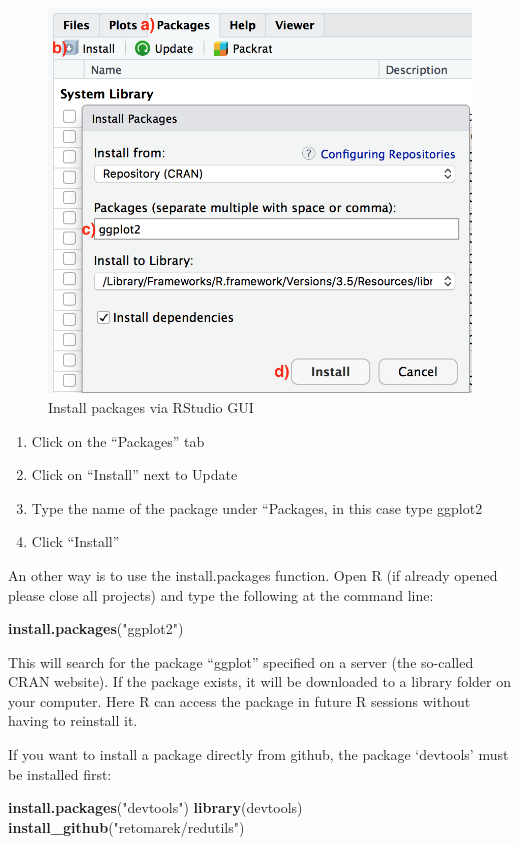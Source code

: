 \documentclass[
]{book}
\newenvironment{Shaded}{\begin{snugshade}}{\end{snugshade}}
\newcommand{\KeywordTok}[1]{\textcolor[rgb]{0.13,0.29,0.53}{\textbf{#1}}}
\newcommand{\NormalTok}[1]{#1}
\newcommand{\StringTok}[1]{\textcolor[rgb]{0.31,0.60,0.02}{#1}}
\begin{document}
\begin{figure}
\includegraphics[width=0.5\linewidth]{images/a2-installPackagesRStudio} \caption{Install packages via RStudio GUI}\label{fig:knitr-logo}
\end{figure}

\begin{enumerate}
\def\labelenumi{\alph{enumi})}
\item
  Click on the ``Packages'' tab
\item
  Click on ``Install'' next to Update
\item
  Type the name of the package under ``Packages, in this case type ggplot2
\item
  Click ``Install''
\end{enumerate}

An other way is to use the install.packages function.
Open R (if already opened please close all projects) and type the following at the command line:

\begin{Shaded}
\begin{Highlighting}[]
\KeywordTok{install.packages}\NormalTok{(}\StringTok{"ggplot2"}\NormalTok{)}
\end{Highlighting}
\end{Shaded}

This will search for the package ``ggplot'' specified on a server (the so-called CRAN website). If the package exists, it will be downloaded to a library folder on your computer. Here R can access the package in future R sessions without having to reinstall it.

If you want to install a package directly from github, the package `devtools' must be installed first:

\begin{Shaded}
\begin{Highlighting}[]
\KeywordTok{install.packages}\NormalTok{(}\StringTok{"devtools"}\NormalTok{)}
\KeywordTok{library}\NormalTok{(devtools)}
\KeywordTok{install_github}\NormalTok{(}\StringTok{"retomarek/redutils"}\NormalTok{)}
\end{Highlighting}
\end{Shaded}
\end{document}

